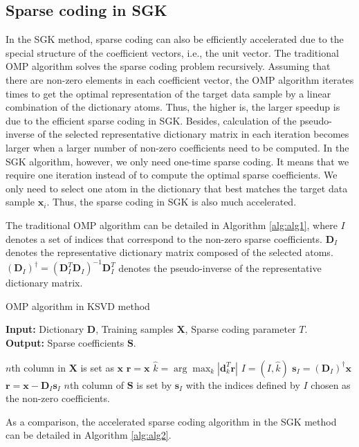 \subsection{Sparse coding in SGK}
In the SGK method, sparse coding can also be efficiently accelerated  due to the special structure of the coefficient vectors, i.e., the unit vector. The traditional OMP algorithm solves the sparse coding problem recursively. Assuming that there are  non-zero elements in each coefficient vector, the OMP algorithm iterates  times to get the optimal representation of the target data sample by a linear combination of the dictionary atoms. Thus, the higher  is, the larger speedup is due to the efficient sparse coding in SGK. Besides, calculation of the pseudo-inverse of the selected representative dictionary matrix in each iteration becomes larger when a larger number of non-zero coefficients need to be computed.  In the SGK algorithm, however, we only need one-time sparse coding. It means that we require one iteration instead of  to compute the optimal sparse coefficients. We only need to select one atom in the dictionary that best matches the target data sample $\mathbf{x}_i$.  Thus, the sparse coding in SGK is also much accelerated.

The traditional OMP algorithm can be detailed in Algorithm \ref{alg:alg1}, where $I$ denotes a set of indices that correspond to the non-zero sparse coefficients. $\mathbf{D}_I$ denotes the representative dictionary matrix composed of the selected atoms. $(\mathbf{D}_I)^{\dagger}=(\mathbf{D}_I^T\mathbf{D}_I)^{-1}\mathbf{D}_I^T$ denotes the pseudo-inverse of the representative dictionary matrix.


\begin{algorithm}
   \caption{OMP algorithm in KSVD method}
   \textbf{Input:} Dictionary $\mathbf{D}$, Training samples $\mathbf{X}$, Sparse coding parameter $T$. \\
   \textbf{Output:} Sparse coefficients $\mathbf{S}$. 
    \begin{algorithmic}[1]
 \State $n$th column in $\mathbf{X}$ is set as $\mathbf{x}$
 \State  $\mathbf{r}=\mathbf{x}$
     \State $\hat{k}  = \displaystyle\arg\max_{k} |\mathbf{d}_k^T\mathbf{r}|$ 
     \State $I=(I,\hat{k})$
     \State $\mathbf{s}_I=\left(\mathbf{D}_I\right)^{\dagger}\mathbf{x}$
     \State $\mathbf{r}=\mathbf{x} - \mathbf{D}_I \mathbf{s}_I$ 
 \EndFor
  \State  $n$th column of $\mathbf{S}$ is set by $\mathbf{s}_I$ with the indices defined by $I$ chosen as the non-zero coefficients.
 \EndFor       
        
\end{algorithmic}
\label{alg:alg1}
\end{algorithm}
 As a comparison, the accelerated sparse coding algorithm in the SGK method can be detailed in Algorithm \ref{alg:alg2}.

